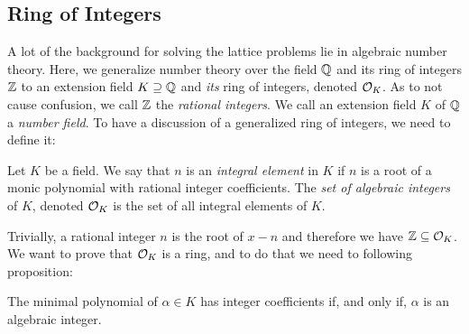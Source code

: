 \subsection{Ring of Integers}
    A lot of the background for solving the lattice problems lie in algebraic number theory. Here, we generalize number theory over the field \(\mathbb{Q}\) and its ring of integers \(\mathbb{Z}\) to an extension field \(K\supseteq\mathbb{Q}\) and \emph{its} ring of integers, denoted \(\mathcal{O}_K\). As to not cause confusion, we call \(\mathbb{Z}\) the \emph{rational integers}. We call an extension field \(K\) of \(\mathbb{Q}\) a \emph{number field}. To have a discussion of a generalized ring of integers, we need to define it:
    \begin{definition}
        Let \(K\) be a field. We say that \(n\) is an \emph{integral element} in \(K\) if \(n\) is a root of a monic polynomial with rational integer coefficients. The \emph{set of algebraic integers} of \(K\), denoted \(\mathcal{O}_K\) is the set of all integral elements of \(K\). 
    \end{definition}
    Trivially, a rational integer \(n\) is the root of \(x - n\) and therefore we have \(\mathbb{Z}\subseteq\mathcal{O}_K\). We want to prove that \(\mathcal{O}_K\) is a ring, and to do that we need to following proposition:
    \begin{proposition}
    \label{Prop: Equivalence Algebraic Integer Integer Minimal Polynomial}
        The minimal polynomial of \(\alpha\in K\) has integer coefficients if, and only if, \(\alpha\) is an algebraic integer.
    \end{proposition}
